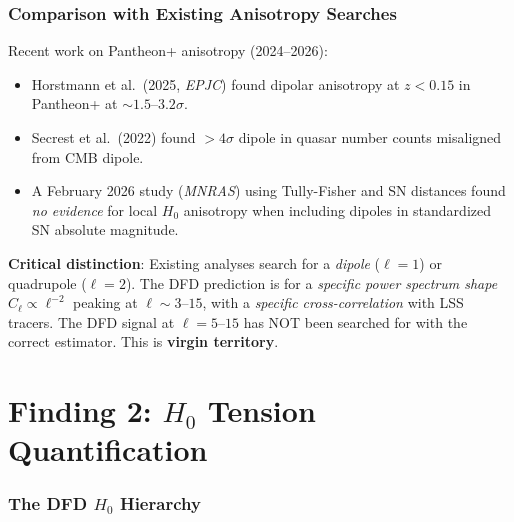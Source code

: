 \documentclass[11pt,a4paper]{article}
\begin{document}
\section{Comparison with Existing Anisotropy Searches}

Recent work on Pantheon+ anisotropy (2024--2026):
\begin{itemize}[nosep]
\item Horstmann et al.\ (2025, \emph{EPJC}) found dipolar anisotropy
  at $z < 0.15$ in Pantheon+ at $\sim 1.5$--$3.2\sigma$.
\item Secrest et al.\ (2022) found $> 4\sigma$ dipole in quasar
  number counts misaligned from CMB dipole.
\item A February 2026 study (\emph{MNRAS}) using Tully-Fisher and SN
  distances found \emph{no evidence} for local $H_0$ anisotropy when
  including dipoles in standardized SN absolute magnitude.
\end{itemize}

\textbf{Critical distinction}: Existing analyses search for a
\emph{dipole} ($\ell = 1$) or quadrupole ($\ell = 2$).  The DFD
prediction is for a \emph{specific power spectrum shape}
$C_\ell \propto \ell^{-2}$ peaking at $\ell \sim 3$--$15$, with a
\emph{specific cross-correlation} with LSS tracers.  The DFD signal
at $\ell = 5$--$15$ has NOT been searched for with the correct
estimator.  This is \textbf{virgin territory}.


\part{Finding 2: $H_0$ Tension Quantification}
\label{sec:h0-tension}


\section{The DFD $H_0$ Hierarchy}
\end{document}
